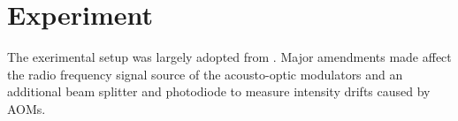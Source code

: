 \chapter{Experiment}

The exerimental setup was largely adopted from \cite{Hertlein2017}. Major
amendments made affect the radio frequency signal source of the acousto-optic
modulators and an additional beam splitter and photodiode to measure intensity
drifts caused by AOMs.
